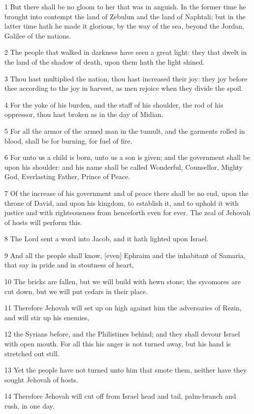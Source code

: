 \par 1 But there shall be no gloom to her that was in anguish. In the former time he brought into contempt the land of Zebulun and the land of Naphtali; but in the latter time hath he made it glorious, by the way of the sea, beyond the Jordan, Galilee of the nations.
\par 2 The people that walked in darkness have seen a great light: they that dwelt in the land of the shadow of death, upon them hath the light shined.
\par 3 Thou hast multiplied the nation, thou hast increased their joy: they joy before thee according to the joy in harvest, as men rejoice when they divide the spoil.
\par 4 For the yoke of his burden, and the staff of his shoulder, the rod of his oppressor, thou hast broken as in the day of Midian.
\par 5 For all the armor of the armed man in the tumult, and the garments rolled in blood, shall be for burning, for fuel of fire.
\par 6 For unto us a child is born, unto us a son is given; and the government shall be upon his shoulder: and his name shall be called Wonderful, Counsellor, Mighty God, Everlasting Father, Prince of Peace.
\par 7 Of the increase of his government and of peace there shall be no end, upon the throne of David, and upon his kingdom, to establish it, and to uphold it with justice and with righteousness from henceforth even for ever. The zeal of Jehovah of hosts will perform this.
\par 8 The Lord sent a word into Jacob, and it hath lighted upon Israel.
\par 9 And all the people shall know, [even] Ephraim and the inhabitant of Samaria, that say in pride and in stoutness of heart,
\par 10 The bricks are fallen, but we will build with hewn stone; the sycomores are cut down, but we will put cedars in their place.
\par 11 Therefore Jehovah will set up on high against him the adversaries of Rezin, and will stir up his enemies,
\par 12 the Syrians before, and the Philistines behind; and they shall devour Israel with open mouth. For all this his anger is not turned away, but his hand is stretched out still.
\par 13 Yet the people have not turned unto him that smote them, neither have they sought Jehovah of hosts.
\par 14 Therefore Jehovah will cut off from Israel head and tail, palm-branch and rush, in one day.
